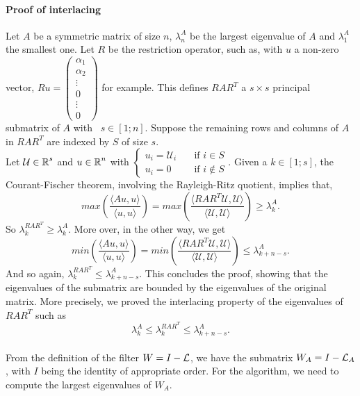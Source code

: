 \paragraph{Proof of interlacing}
Let \(A\) be a symmetric matrix of size \(n\), \(\lambda^A_n\) be the largest eigenvalue of \(A\) and \(\lambda^A_1\) the smallest one.
Let \(R\) be the restriction operator, such as, with \(u\) a non-zero vector, \(Ru = \begin{pmatrix}\alpha_1 \\ \alpha_2 \\ \vdots \\ 0 \\ \vdots \\ 0 \end{pmatrix}\) for example.
This defines \(RAR^T\) a \(s \times s\) principal submatrix of \(A\) with  \(s \in [1; n]\).
Suppose the remaining rows and columns of \(A\) in \(RAR^T\) are indexed by \(S\) of size \(s\). \\
Let \(\mathcal{U} \in \operatorname{\mathbb{R}}^s\) and \(u \in \operatorname{\mathbb{R}}^n\) with \(\begin{cases} u_i = \mathcal{U}_i & \quad \text{if } i \in S \\ u_i = 0 & \quad \text{if } i \notin S \end{cases}\).
Given a \(k \in [1; s]\), the Courant-Fischer theorem, involving the Rayleigh-Ritz quotient, implies that,
\[max\left(\frac{\langle Au, u \rangle}{\langle u, u\rangle}\right) = max\left(\frac{\langle RAR^T\mathcal{U}, \mathcal{U}\rangle}{\langle \mathcal{U}, \mathcal{U} \rangle}\right) \ge \lambda^A_k.\]
So \(\lambda^{RAR^T}_k \ge \lambda^A_k\).
More over, in the other way, we get
\[min\left(\frac{\langle Au, u \rangle}{\langle u, u\rangle}\right) = min\left(\frac{\langle RAR^T\mathcal{U}, \mathcal{U}\rangle}{\langle \mathcal{U}, \mathcal{U} \rangle}\right) \le \lambda^A_{k+n-s}.\]
And so again, \(\lambda^{RAR^T}_k \le \lambda^A_{k+n-s}\).
This concludes the proof, showing that the eigenvalues of the submatrix are bounded by the eigenvalues of the original matrix.
More precisely, we proved the interlacing property of the eigenvalues of \(RAR^T\) such as
\[\lambda^A_k \le \lambda^{RAR^T}_k \le \lambda^A_{k+n-s}.\]

\paragraph{}
From the definition of the filter \(W = I - \operatorname{\mathcal{L}}\), we have the submatrix \(W_A = I - \operatorname{\mathcal{L}}_A\), with \(I\) being the identity of appropriate order.
For the algorithm, we need to compute the largest eigenvalues of \(W_A\).

